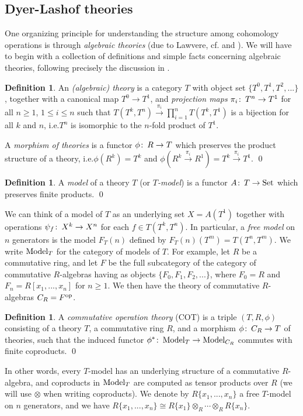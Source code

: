 \documentclass{gtpart}
\theoremstyle{definition}
\newtheorem{defn}[thm]{Definition}
\theoremstyle{remark}
\def\co{\colon\thinspace}
\newcommand{\Model}{{\rm Model}}
\begin{document}
\subsection{Dyer-Lashof theories}

One organizing principle for understanding the structure among cohomology 
operations is through {\em algebraic theories} (due to Lawvere, cf. 
\cite{lawvere} and \cite[chapter 3]{borceux}).  We will have to begin with a 
collection of definitions and simple facts concerning algebraic theories, 
following precisely the discussion in \cite[sections 5--9]{lpo}.  

\begin{defn}
 An {\em (algebraic) theory} is a category $T$ with object set 
 $\{T^0,T^1,T^2,...\}$, together with a canonical map $T^0 \to T^1$, and {\em 
 projection maps} $\pi_i\co T^n \to T^1$ for all $n \geq 1$, $1 \leq i \leq n$ 
 such that $T(T^k,T^n) \xrightarrow{\pi_i} \prod_{i=1}^n T(T^k,T^1)$ is a 
 bijection for all $k$ and $n$, i.e.\thinspace$T^n$ is isomorphic to the 
 $n$-fold product of $T^1$.  
 
 A {\em morphism of theories} is a functor $\phi\co R \to T$ which preserves 
 the product structure of a theory, i.e.\thinspace$\phi(R^k) = T^k$ and 
 $\phi(R^k \stackrel{\pi_i}{\longrightarrow} R^1) = T^k 
 \stackrel{\pi_i}{\longrightarrow} T^1$.  \qed
\end{defn}
\begin{defn}
 A {\em model} of a theory $T$ (or {\em $T$-model}) is a functor 
 $A\co T \to {\rm Set}$ which preserves finite products.  \qed
\end{defn}
We can think of a model of $T$ as an underlying set $X = A(T^1)$ together with 
operations $\psi_f\co X^k \to X^n$ for each $f \in T(T^k,T^n)$.  In 
particular, a {\em free model} on $n$ generators is the model $F_T(n)$ defined 
by $F_T(n)(T^m) = T(T^n,T^m)$.  We write $\Model_T$ for the category of models 
of $T$.  For example, let $R$ be a commutative ring, and let $F$ be the full 
subcategory of the category of commutative $R$-algebras having as objects 
$\{F_0,F_1,F_2,...\}$, where $F_0 = R$ and $F_n = R[x_1,...,x_n]$ for $n \geq 
1$.  We then have the theory of commutative $R$-algebras $C_R = F^{\rm op}$.  
\begin{defn}
 A {\em commutative operation theory} (COT) is a triple $(T,R,\phi)$ 
 consisting of a theory $T$, a commutative ring $R$, and a morphism 
 $\phi\co C_R \to T$ of theories, such that the induced functor 
 $\phi^*\co \Model_T \to \Model_{C_R}$ commutes with finite coproducts.  \qed
\end{defn}
In other words, every $T$-model has an underlying structure of a commutative 
$R$-algebra, and coproducts in $\Model_T$ are computed as tensor products over 
$R$ (we will use $\otimes$ when writing coproducts).  We denote by 
$R\{x_1,...,x_n\}$ a free $T$-model on $n$ generators, and we have 
$R\{x_1,...,x_n\} \cong R\{x_1\} \otimes_R \cdots \otimes_R R\{x_n\}$.  
\end{document}
